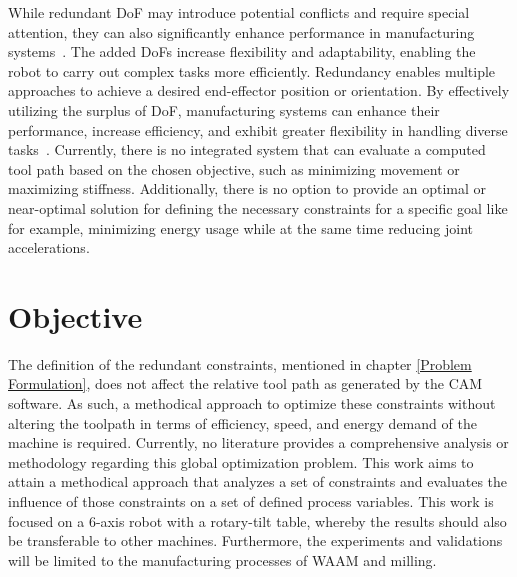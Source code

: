 
While redundant DoF may introduce potential conflicts and require special attention, they can also significantly enhance performance in manufacturing systems~\cite{Ayten.2016}. The added DoFs increase flexibility and adaptability, enabling the robot to carry out complex tasks more efficiently. Redundancy enables multiple approaches to achieve a desired end-effector position or orientation. By effectively utilizing the surplus of DoF, manufacturing systems can enhance their performance, increase efficiency, and exhibit greater flexibility in handling diverse tasks~\cite{Boscariol.2020}. 
\newpage
Currently, there is no integrated system that can evaluate a computed tool path based on the chosen objective, such as minimizing movement or maximizing stiffness. %
Additionally, there is no option to provide an optimal or near-optimal solution for defining the necessary constraints for a specific goal like for example, minimizing energy usage while at the same time reducing joint accelerations.


\section{Objective}\label{OBJECTIVE}
The definition of the redundant constraints, mentioned in chapter \ref{Problem Formulation}, does not affect the relative tool path as generated by the CAM software. As such, a methodical approach to optimize these constraints without altering the toolpath in terms of efficiency, speed, and energy demand of the machine is required. Currently, no literature provides a comprehensive analysis or methodology regarding this global optimization problem.
This work aims to attain a methodical approach that analyzes a set of constraints and evaluates the influence of those constraints on a set of defined process variables. This work is focused on a 6-axis robot with a rotary-tilt table, whereby the results should also be transferable to other machines. Furthermore, the experiments and validations will be limited to the manufacturing processes of WAAM and milling. 


